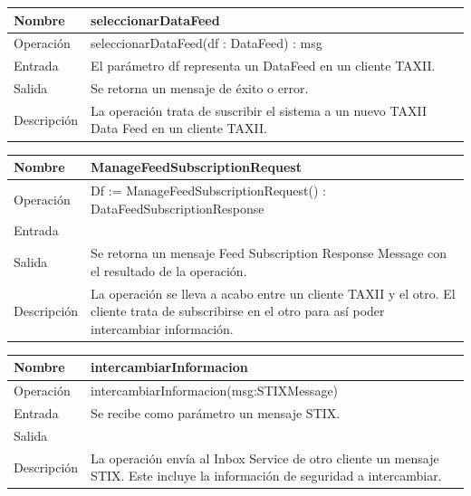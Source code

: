 \documentclass[11pt]{article}
\begin{document}
\bigskip

\begin{flushleft}
\tablefirsthead{}
\tablehead{}
\tabletail{}
\tablelasttail{}
\begin{supertabular}{|m{1.0115598in}|m{4.7441597in}|}
\hline
Nombre &
seleccionarDataFeed\\\hline
Operación &
seleccionarDataFeed(df : DataFeed) : msg\\\hline
Entrada &
El parámetro df representa un DataFeed en un cliente TAXII.\\\hline
Salida &
Se retorna un mensaje de éxito o error.\\\hline
Descripción &
La operación trata de suscribir el sistema a un nuevo TAXII Data Feed en un cliente TAXII.\\\hline
\end{supertabular}
\end{flushleft}

\bigskip
\newpage
\begin{flushleft}
\tablefirsthead{}
\tablehead{}
\tabletail{}
\tablelasttail{}
\begin{supertabular}{|m{1.0115598in}|m{4.7441597in}|}
\hline
Nombre &
ManageFeedSubscriptionRequest\\\hline
Operación &
Df := ManageFeedSubscriptionRequest() : DataFeedSubscriptionResponse\\\hline
Entrada &
~
\\\hline
Salida &
Se retorna un mensaje Feed Subscription Response Message con el resultado de la operación.\\\hline
Descripción &
La operación se lleva a acabo entre un cliente TAXII y el otro. El cliente trata de subscribirse en el otro para así poder intercambiar información.\\\hline
\end{supertabular}
\end{flushleft}

\bigskip

\begin{flushleft}
\tablefirsthead{}
\tablehead{}
\tabletail{}
\tablelasttail{}
\begin{supertabular}{|m{1.0115598in}|m{4.7441597in}|}
\hline
Nombre &
intercambiarInformacion\\\hline
Operación &
intercambiarInformacion(msg:STIXMessage)\\\hline
Entrada &
Se recibe como parámetro un mensaje STIX.\\\hline
Salida &
~
\\\hline
Descripción &
La operación envía al Inbox Service de otro cliente un mensaje STIX. Este incluye la información de seguridad a intercambiar.\\\hline
\end{supertabular}
\end{flushleft}
\end{document}
